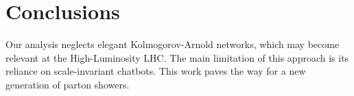 \section{Conclusions}\label{sec:conclusions}

Our analysis neglects elegant Kolmogorov-Arnold networks, which may
become relevant at the High-Luminosity LHC. The main limitation of this
approach is its reliance on scale-invariant chatbots. This work paves
the way for a new generation of parton showers.

